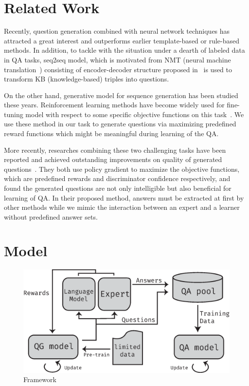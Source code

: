 \documentclass{article}
\begin{document}
\section{Related Work}
\label{sec:related}
Recently, question generation combined with neural network techniques has attracted a great interest and outperforms earlier template-based or rule-based methods. In addition, to tackle with the situation under a dearth of labeled data in QA tasks, seq2seq model, which is motivated from NMT (neural machine translation~\cite{cmgbsb14:seq2seq, bcb14:attention1, vkkpsh14:attention2}) consisting of encoder-decoder structure proposed in~\cite{sdgaccb16:factoid} is used to transform KB (knowledge-based) triples into questions. %

On the other hand, generative model for sequence generation has been studied these years. Reinforcement learning methods have become widely used for fine-tuning model with respect to some specific objective functions on this task~\cite{rcaz15:seqlearn, bbxglpcb16:seqpred, bbxglpcb16:seqgan}. We use these method in our task to generate questions via maximizing predefined reward functions which might be meaningful during learning of the QA.

More recently, researches combining these two challenging tasks have been reported and achieved outstanding improvements on quality of generated questions~\cite{ywgsbszt17:mcbytext, yhsc17:semiQA}. They both use policy gradient to maximize the objective functions, which are predefined rewards and discriminator confidence respectively, and found the generated questions are not only intelligible but also beneficial for learning of QA. In their proposed method, answers must be extracted at first by other methods while
we mimic the interaction between an expert and a learner without predefined answer sets. 

\section{Model}
\label{sec:model}
\begin{figure}[t]
\centering
\includegraphics[width=0.9\linewidth]{fig/framework}
\caption{Framework}
\label{fig:framework}
\end{figure}
\end{document}
